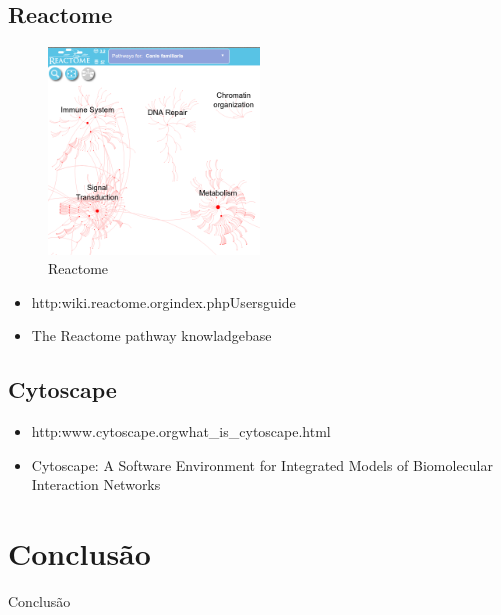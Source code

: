 \documentclass[conference]{IEEEtran}
\begin{document}
\subsection{Reactome}

\begin{figure}[!t]
\centering
\includegraphics[width=0.5\textwidth]{reactome_canis_small.png}
\caption{Reactome}
\label{reactome_canis_small}
\end{figure}

\begin{itemize}
\item http:\/\/wiki.reactome.org\/index.php\/Usersguide
\item The Reactome pathway knowladgebase
\end{itemize}

\subsection{Cytoscape}

\begin{itemize}
\item http:\/\/www.cytoscape.org\/what\_is\_cytoscape.html
\item Cytoscape: A Software Environment for Integrated Models of Biomolecular Interaction Networks
\end{itemize}

\section{Conclusão}

Conclusão
\end{document}
